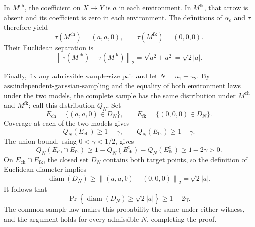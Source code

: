In \(M^{\mathrm{ch}}\), the coefficient on \(X\to Y\) is \(a\) in each environment.  In \(M^{\mathrm{fk}}\), that arrow is absent and its coefficient is zero in each environment.  The definitions of \(\alpha_e\) and \(\tau\) therefore yield
\[
 \tau(M^{\mathrm{ch}})=(a,a,0),
 \qquad
 \tau(M^{\mathrm{fk}})=(0,0,0).
\]
Their Euclidean separation is
\[
 \left\lVert\tau(M^{\mathrm{ch}})-\tau(M^{\mathrm{fk}})\right\rVert_2
 =\sqrt{a^2+a^2}=\sqrt2\lvert a\rvert.
\]

Finally, fix any admissible sample-size pair and let \(N=n_1+n_2\).  By \(\text{ass:independent-gaussian-sampling}\) and the equality of both environment laws under the two models, the complete sample has the same distribution under \(M^{\mathrm{ch}}\) and \(M^{\mathrm{fk}}\); call this distribution \(Q_N\).  Set
\[
 E_{\mathrm{ch}}=\{(a,a,0)\in D_N\},
 \qquad
 E_{\mathrm{fk}}=\{(0,0,0)\in D_N\}.
\]
Coverage at each of the two models gives
\[
 Q_N(E_{\mathrm{ch}})\geq1-\gamma,
 \qquad
 Q_N(E_{\mathrm{fk}})\geq1-\gamma.
\]
The union bound, using \(0<\gamma<1/2\), gives
\[
 Q_N(E_{\mathrm{ch}}\cap E_{\mathrm{fk}})
 \geq1-Q_N(E_{\mathrm{ch}}^c)-Q_N(E_{\mathrm{fk}}^c)
 \geq1-2\gamma>0.
\]
On \(E_{\mathrm{ch}}\cap E_{\mathrm{fk}}\), the closed set \(D_N\) contains both target points, so the definition of Euclidean diameter implies
\[
 \operatorname{diam}(D_N)
 \geq\left\lVert(a,a,0)-(0,0,0)\right\rVert_2
 =\sqrt2\lvert a\rvert.
\]
It follows that
\[
 \Pr\!\left\{\operatorname{diam}(D_N)\geq\sqrt2\lvert a\rvert\right\}
 \geq1-2\gamma.
\]
The common sample law makes this probability the same under either witness, and the argument holds for every admissible \(N\), completing the proof.

